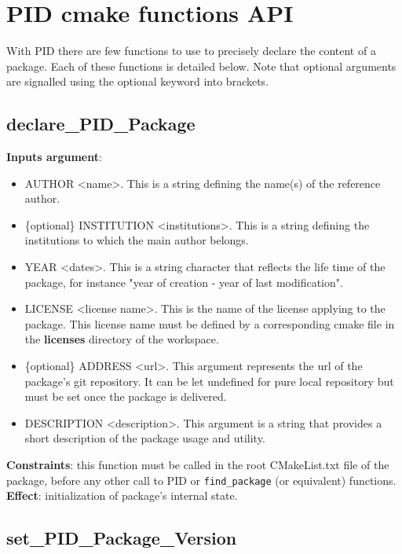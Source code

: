 \documentclass[12pt,a4paper]{article}
\begin{document}
\section{PID cmake functions API}
\label{sec:PIDCMakefunctionsAPI}

With PID there are few functions to use to precisely declare the content of a package. Each of these functions is detailed below. Note that optional arguments are signalled using the optional keyword into brackets.

\subsection{declare\_PID\_Package}

\textbf{Inputs argument}: 
\begin{itemize}
\item AUTHOR <name>. This is a string defining the name(s) of the reference author.
\item \{optional\} INSTITUTION <institutions>. This is a string defining the institutions to which the main author belongs.
\item YEAR <dates>. This is a string character that reflects the life time of the package, for instance "year of creation - year of last modification".
\item LICENSE <license name>. This is the name of the license applying to the package. This license name must be defined by a corresponding cmake file in the \textbf{licenses} directory of the workspace.
\item \{optional\} ADDRESS <url>. This argument represents the url of the package's git repository. It can be let undefined for pure local repository but must be set once the package is delivered.
\item DESCRIPTION <description>. This argument is a string that provides a short description of the package usage and utility.
\end{itemize}
\textbf{Constraints}: this function must be called in the root CMakeList.txt file of the package, before any other call to PID or \texttt{find\_package} (or equivalent) functions.\\
\textbf{Effect}: initialization of package's internal state.

\subsection{set\_PID\_Package\_Version}
\end{document}
